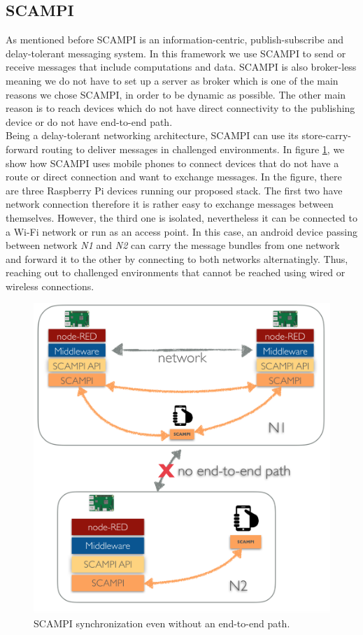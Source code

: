\subsection{SCAMPI}
As mentioned before SCAMPI is an information-centric, publish-subscribe and delay-tolerant messaging system. In this framework we use SCAMPI to send or receive messages that include computations and data. SCAMPI is also broker-less meaning we do not have to set up a server as broker which is one of the main reasons we chose SCAMPI, in order to be dynamic as possible. The other main reason is to reach devices which do not have direct connectivity to the publishing device or do not have end-to-end path. \\

\noindent Being a delay-tolerant networking architecture, SCAMPI can use its store-carry-forward routing to deliver messages in challenged environments. In figure \ref{fig:scampi-design}, we show how SCAMPI uses mobile phones to connect devices that do not have a route or  direct connection and want to exchange messages. In the figure, there are three Raspberry Pi devices running our proposed stack. The first two  have network connection therefore it is rather easy to exchange messages between themselves. However, the third one is isolated, nevertheless it can be connected to a Wi-Fi network or run as an access point. In this case, an android device passing  between network \textit{N1} and \textit{N2} can carry the message bundles from one network and forward it to the other by connecting to both networks alternatingly.  Thus, reaching out to challenged environments that cannot be reached using wired or wireless connections.

\begin{figure}[H]
	\centering
	\includegraphics[scale=0.4]{images/scampi.png}
	\caption{SCAMPI synchronization even without an end-to-end path. }
	\label{fig:scampi-design}
\end{figure}

